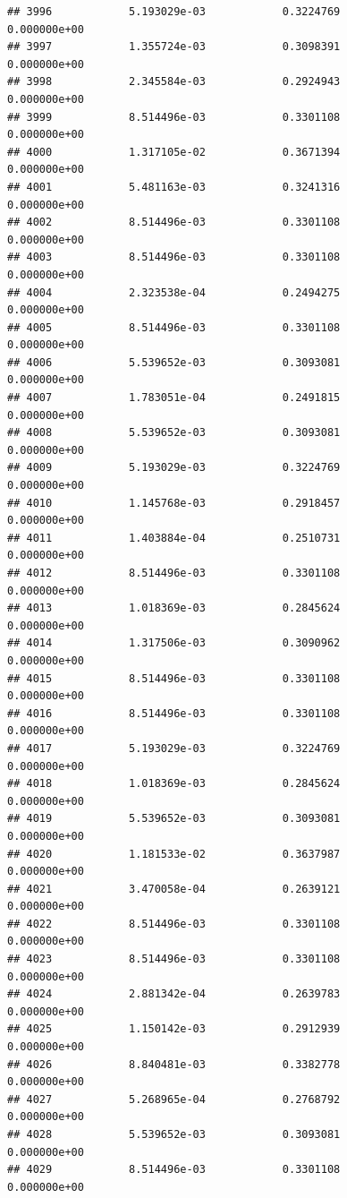 \documentclass[
]{article}
\begin{document}
\begin{verbatim}
## 3996            5.193029e-03            0.3224769            0.000000e+00
## 3997            1.355724e-03            0.3098391            0.000000e+00
## 3998            2.345584e-03            0.2924943            0.000000e+00
## 3999            8.514496e-03            0.3301108            0.000000e+00
## 4000            1.317105e-02            0.3671394            0.000000e+00
## 4001            5.481163e-03            0.3241316            0.000000e+00
## 4002            8.514496e-03            0.3301108            0.000000e+00
## 4003            8.514496e-03            0.3301108            0.000000e+00
## 4004            2.323538e-04            0.2494275            0.000000e+00
## 4005            8.514496e-03            0.3301108            0.000000e+00
## 4006            5.539652e-03            0.3093081            0.000000e+00
## 4007            1.783051e-04            0.2491815            0.000000e+00
## 4008            5.539652e-03            0.3093081            0.000000e+00
## 4009            5.193029e-03            0.3224769            0.000000e+00
## 4010            1.145768e-03            0.2918457            0.000000e+00
## 4011            1.403884e-04            0.2510731            0.000000e+00
## 4012            8.514496e-03            0.3301108            0.000000e+00
## 4013            1.018369e-03            0.2845624            0.000000e+00
## 4014            1.317506e-03            0.3090962            0.000000e+00
## 4015            8.514496e-03            0.3301108            0.000000e+00
## 4016            8.514496e-03            0.3301108            0.000000e+00
## 4017            5.193029e-03            0.3224769            0.000000e+00
## 4018            1.018369e-03            0.2845624            0.000000e+00
## 4019            5.539652e-03            0.3093081            0.000000e+00
## 4020            1.181533e-02            0.3637987            0.000000e+00
## 4021            3.470058e-04            0.2639121            0.000000e+00
## 4022            8.514496e-03            0.3301108            0.000000e+00
## 4023            8.514496e-03            0.3301108            0.000000e+00
## 4024            2.881342e-04            0.2639783            0.000000e+00
## 4025            1.150142e-03            0.2912939            0.000000e+00
## 4026            8.840481e-03            0.3382778            0.000000e+00
## 4027            5.268965e-04            0.2768792            0.000000e+00
## 4028            5.539652e-03            0.3093081            0.000000e+00
## 4029            8.514496e-03            0.3301108            0.000000e+00

\end{verbatim}
\end{document}
